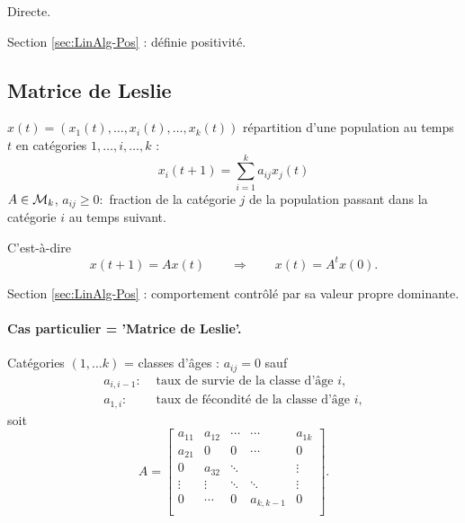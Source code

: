 \proof Directe. \eproof

\remark Section \ref{sec:LinAlg-Pos} : définie positivité.

\subsection{Matrice de Leslie}  \label{sec:MatLeslie}

$x(t) = (x_1(t), \dots, x_i(t), \dots, x_k(t))$ répartition d'une population au temps $t$ en catégories $1, \dots, i, \dots, k$ :
$$
x_i(t+1) = \sum_{i=1}^k a_{ij} x_j(t) 
$$
$A \in \mathcal{M}_k$, $a_{ij} \geq 0 : $ fraction de la catégorie $j$ de la population passant dans la catégorie $i$ au temps suivant. 

C'est-à-dire
$$
x(t+1) = A x(t) 
\qquad \Rightarrow \qquad 
x(t) = A^t x(0).
$$

\remark Section \ref{sec:LinAlg-Pos} : comportement contrôlé par sa valeur propre dominante.

\paragraph*{Cas particulier = 'Matrice de Leslie'.}

Catégories $(1, \dots k)$ = classes d'âges : $a_{ij} = 0$ sauf 
\begin{align*}
  a_{i, i-1} : & \text{ taux de survie de la classe d'âge $i$}, \\
  a_{1, i} : & \text{ taux de fécondité de la classe d'âge $i$}, 
\end{align*}
soit 
$$
A = \left[\begin{array}{cccccc}
            a_{11} & a_{12} & \cdots  & \cdots & a_{1k} \\
            a_{21} & 0 & 0  & \cdots & 0 \\
            0 & a_{32} & \ddots & & \vdots \\
            \vdots & \vdots & \ddots & \ddots & \vdots \\
            0 & \cdots & 0 & a_{k, k-1} & 0 \\
          \end{array}\right].
$$

